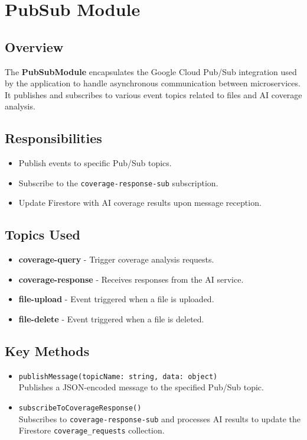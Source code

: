 \section{PubSub Module}

\subsection*{Overview}

The \textbf{PubSubModule} encapsulates the Google Cloud Pub/Sub integration used by the application to handle asynchronous communication between microservices. It publishes and subscribes to various event topics related to files and AI coverage analysis.

\subsection*{Responsibilities}

\begin{itemize}
    \item Publish events to specific Pub/Sub topics.
    \item Subscribe to the \texttt{coverage-response-sub} subscription.
    \item Update Firestore with AI coverage results upon message reception.
\end{itemize}

\subsection*{Topics Used}

\begin{itemize}
    \item \textbf{coverage-query} - Trigger coverage analysis requests.
    \item \textbf{coverage-response} - Receives responses from the AI service.
    \item \textbf{file-upload} - Event triggered when a file is uploaded.
    \item \textbf{file-delete} - Event triggered when a file is deleted.
\end{itemize}

\subsection*{Key Methods}

\begin{itemize}
    \item \texttt{publishMessage(topicName: string, data: object)} \\
    Publishes a JSON-encoded message to the specified Pub/Sub topic.

    \item \texttt{subscribeToCoverageResponse()} \\
    Subscribes to \texttt{coverage-response-sub} and processes AI results to update the Firestore \texttt{coverage\_requests} collection.
\end{itemize}

